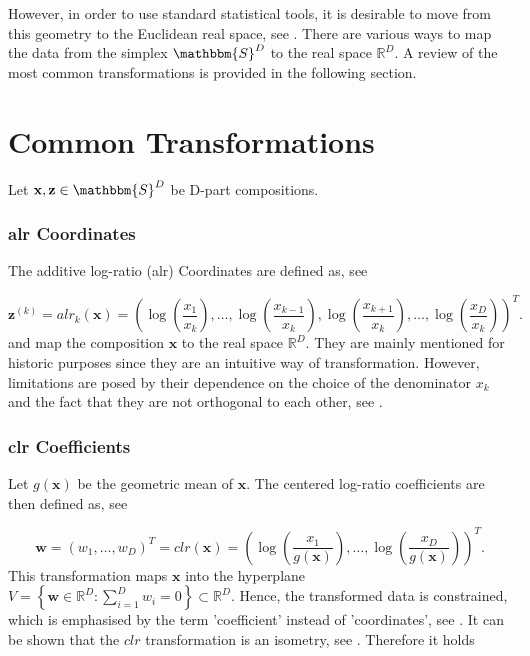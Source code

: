 However, in order to use standard statistical tools, it is desirable to move from this geometry to the Euclidean real space, see \textcite{Filzmoser:2020}. There are various ways to map the data from the simplex $\mathbbm{S}^D$ to the real space $\mathbb{R}^D$. A review of the most common transformations is provided in the following section.

\section{Common Transformations}
\label{sec: Common Transformations}

Let $\textbf{x}, \textbf{z} \in \mathbbm{S}^D$ be D-part compositions.
\subsubsection{alr Coordinates}
\label{sec:alr Coordinates}

The additive log-ratio (alr) Coordinates are defined as, see \textcite{Kynclova:2015}

\begin{equation}
\textbf{z}^{(k)} = alr_k(\textbf{x}) = \left(\log\left(\frac{x_1}{x_k}\right), \ldots, \log\left(\frac{x_{k-1}}{x_k}\right),\log\left(\frac{x_{k+1}}{x_k}\right),\ldots,\log\left(\frac{x_D}{x_k}\right)\right)^T.
\label{eq:alr Coordinates}
\end{equation}
%
and map the composition $\textbf{x}$ to the real space $\mathbb{R}^D$. They are mainly mentioned for historic purposes since they are an intuitive way of transformation. However, limitations are posed by their dependence on the choice of the denominator $x_k$ and the fact that they are not orthogonal to each other, see \textcite{Filzmoser:2020}. 

\subsubsection{clr Coefficients}
\label{sec:clr Coefficients}

Let $g(\textbf{x})$ be the geometric mean of $\textbf{x}$. The centered log-ratio coefficients are then defined as, see \textcite{Kynclova:2015}

\begin{equation}
\textbf{w} = (w_1,\ldots, w_D)^T = clr(\textbf{x}) = \left(\log\left(\frac{x_1}{g(\textbf{x})}\right),\ldots, \log\left(\frac{x_D}{g(\textbf{x})}\right)\right)^T.
\label{eq:clr Coefficients}
\end{equation}
%
This transformation maps $\textbf{x}$ into the hyperplane $V = \left\{\textbf{w} \in \mathbb{R}^D: \sum_{i=1}^D w_i=0\right\} \subset \mathbb{R}^D$. Hence, the transformed data is constrained, which is emphasised by the term 'coefficient' instead of 'coordinates', see \textcite{Filzmoser:2020}. It can be shown that the $clr$ transformation is an isometry, see \textcite{Egozcue:2003}. Therefore it holds 

